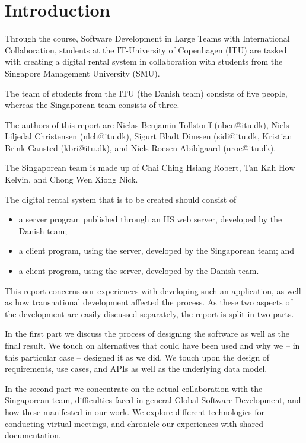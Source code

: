 \section{Introduction}

Through the course, Software Development in Large Teams with International Collaboration,
students at the IT-University of Copenhagen (ITU) are tasked with creating a digital rental
system in collaboration with students from the Singapore Management University (SMU).

The team of students from the ITU (the Danish team) consists of five people, whereas the
Singaporean team consists of three.

The authors of this report are Niclas Benjamin Tollstorff (nben@itu.dk), Niels Liljedal
Christensen (nlch@itu.dk), Sigurt Bladt Dinesen (sidi@itu.dk, Kristian Brink Gansted
(kbri@itu.dk), and Niels Roesen Abildgaard (nroe@itu.dk).

The Singaporean team is made up of Chai Ching Hsiang Robert, Tan Kah How Kelvin, and
Chong Wen Xiong Nick.

The digital rental system that is to be created should consist of
\begin{itemize}
    \item a server program published through an IIS web server, developed by the Danish team;
    \item a client program, using the server, developed by the Singaporean team; and
    \item a client program, using the server, developed by the Danish team.
\end{itemize}

This report concerns our experiences with developing such an application, as well as how
transnational development affected the process. As these two aspects of the development
are easily discussed separately, the report is split in two parts.

In the first part we discuss the process of designing the software as well as the final
result. We touch on alternatives that could have been used and why we – in this particular
case – designed it as we did. We touch upon the design of requirements, use cases, and APIs
as well as the underlying data model.

In the second part we concentrate on the actual collaboration with the Singaporean team,
difficulties faced in general Global Software Development, and how these manifested in
our work. We explore different technologies for conducting virtual meetings, and chronicle
our experiences with shared documentation.
